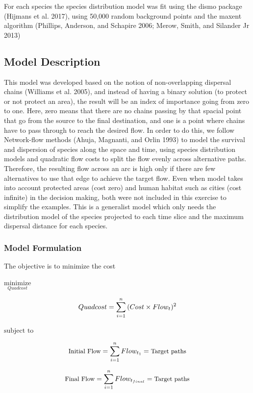 \documentclass[]{article}
\begin{document}
For each species the species distribution model was fit using the dismo package (Hijmans et al. 2017), using 50,000 random background points and the maxent algorithm (Phillips, Anderson, and Schapire 2006; Merow, Smith, and Silander Jr 2013)

\hypertarget{model-description}{%
\subsection{Model Description}\label{model-description}}

This model was developed based on the notion of non-overlapping dispersal chains (Williams et al. 2005), and instead of having a binary solution (to protect or not protect an area), the result will be an index of importance going from zero to one. Here, zero means that there are no chains passing by that spacial point that go from the source to the final destination, and one is a point where chains have to pass through to reach the desired flow.
In order to do this, we follow Network-flow methods (Ahuja, Magnanti, and Orlin 1993) to model the survival and dispersion of species along the space and time, using species distribution models and quadratic flow costs to split the flow evenly across alternative paths. Therefore, the resulting flow across an arc is high only if there are few alternatives to use that edge to achieve the target flow.
Even when model takes into account protected areas (cost zero) and human habitat such as cities (cost infinite) in the decision making, both were not included in this exercise to simplify the examples. This is a generalist model which only needs the distribution model of the species projected to each time slice and the maximum dispersal distance for each species.

\hypertarget{model-formulation}{%
\subsubsection{Model Formulation}\label{model-formulation}}

The objective is to minimize the cost

\(\underset{Quadcost}{\text{minimize}}\)

\[\small Quadcost =  \sum_{i=1}^n{(Cost\times Flow_t)^2}\]

\(\text{subject to}\)

\[\small \text{Initial Flow} = \sum_{i=1}^n{Flow_{t_1}} = \text{Target paths}\]

\[\small \text{Final Flow} = \sum_{i=1}^n{Flow_{t_{final}}} = \text{Target paths}\]
\end{document}
